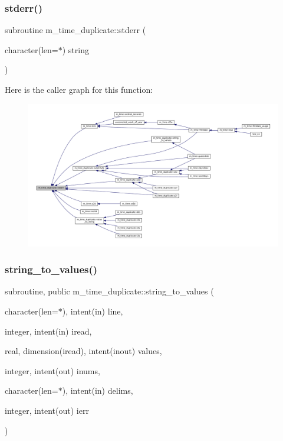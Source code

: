 \subsubsection{\texorpdfstring{stderr()}{stderr()}}
{\footnotesize\ttfamily subroutine m\+\_\+time\+\_\+duplicate\+::stderr (\begin{DoxyParamCaption}\item[{character(len=$\ast$)}]{string }\end{DoxyParamCaption})}

Here is the caller graph for this function\+:\nopagebreak
\begin{figure}[H]
\begin{center}
\leavevmode
\includegraphics[width=350pt]{namespacem__time__duplicate_aaf5c25d7bce4f2776df6c1e586b2e277_icgraph}
\end{center}
\end{figure}
\mbox{\label{namespacem__time__duplicate_a1bfa9e4483f2452c89c0388971bb21bd}} 
\subsubsection{\texorpdfstring{string\+\_\+to\+\_\+values()}{string\_to\_values()}}
{\footnotesize\ttfamily subroutine, public m\+\_\+time\+\_\+duplicate\+::string\+\_\+to\+\_\+values (\begin{DoxyParamCaption}\item[{character(len=$\ast$), intent(in)}]{line,  }\item[{integer, intent(in)}]{iread,  }\item[{real, dimension(iread), intent(inout)}]{values,  }\item[{integer, intent(out)}]{inums,  }\item[{character(len=$\ast$), intent(in)}]{delims,  }\item[{integer, intent(out)}]{ierr }\end{DoxyParamCaption})}



